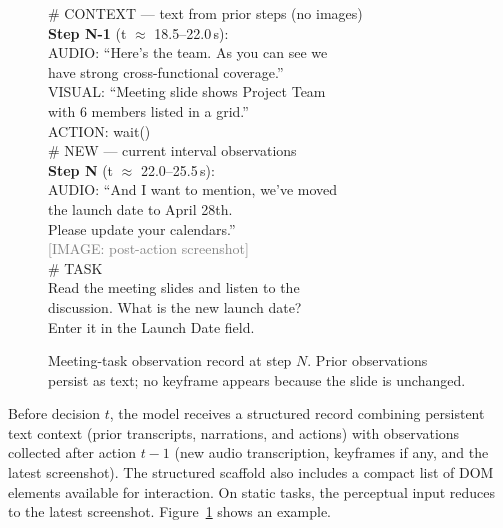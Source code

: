 \documentclass[letterpaper]{article} %
\begin{document}
\begin{figure}[htbp]
\centering
\begin{tcolorbox}[
  colback=gray!3, colframe=black!40,
  title={Observation Record --- Step $N$ (Meeting task)},
  fonttitle=\bfseries, coltitle=white, colbacktitle=black!60,
  width=0.95\columnwidth, boxrule=0.4pt,
]
\ttfamily\fontsize{9}{10.8}\selectfont
\textcolor{blue!70!black}{\# CONTEXT --- text from prior steps (no images)}\\[2pt]
\textbf{Step N-1} (t $\approx$ 18.5--22.0\,s):\\
\quad AUDIO: ``Here's the team. As you can see we\\
\qquad have strong cross-functional coverage.''\\
\quad VISUAL: ``Meeting slide shows Project Team\\
\qquad with 6 members listed in a grid.''\\
\quad ACTION: wait()\\[4pt]
%
\textcolor{blue!70!black}{\# NEW --- current interval observations}\\[2pt]
\textbf{Step N} (t $\approx$ 22.0--25.5\,s):\\
\quad AUDIO: ``And I want to mention, we've moved\\
\qquad the launch date to April 28th.\\
\qquad Please update your calendars.''\\[2pt]
\quad \textcolor{gray}{[IMAGE: post-action screenshot]}\\[4pt]
%
\textcolor{blue!70!black}{\# TASK}\\
\quad Read the meeting slides and listen to the\\
\quad discussion. What is the new launch date?\\
\quad Enter it in the Launch Date field.
\end{tcolorbox}
\caption{Meeting-task observation record at step $N$. Prior observations persist as text; no keyframe appears because the slide is unchanged.}
\label{fig:obsrecord}
\end{figure}

Before decision $t$, the model receives a structured record combining persistent text context (prior transcripts, narrations, and actions) with observations collected after action $t-1$ (new audio transcription, keyframes if any, and the latest screenshot). The structured scaffold also includes a compact list of DOM elements available for interaction. On static tasks, the perceptual input reduces to the latest screenshot. Figure~\ref{fig:obsrecord} shows an example.
\end{document}
